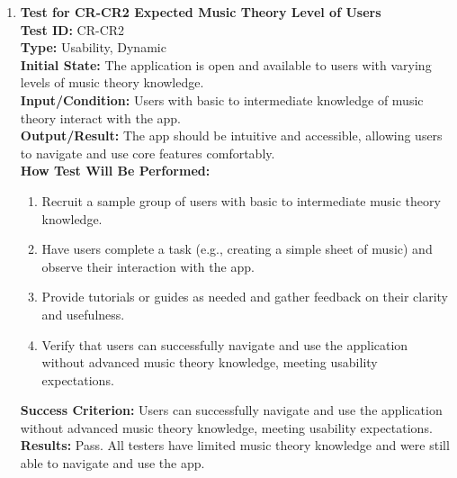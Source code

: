 \documentclass[12pt, titlepage]{article}
\begin{document}
\begin{enumerate}
    \item \textbf{Test for CR-CR2 Expected Music Theory Level of Users} \\
      \newline
      \textbf{Test ID:} CR-CR2 \\
      \textbf{Type:} Usability, Dynamic \\
      \textbf{Initial State:} The application is open and available to users with varying levels of music theory knowledge. \\
      \textbf{Input/Condition:} Users with basic to intermediate knowledge of music theory interact with the app. \\
      \textbf{Output/Result:} The app should be intuitive and accessible, allowing users to navigate and use core features comfortably. \\
      \textbf{How Test Will Be Performed:}
      \begin{enumerate}
          \item Recruit a sample group of users with basic to intermediate music theory knowledge.
          \item Have users complete a task (e.g., creating a simple sheet of music) and observe their interaction with the app.
          \item Provide tutorials or guides as needed and gather feedback on their clarity and usefulness.
          \item Verify that users can successfully navigate and use the application without advanced music theory knowledge, 
          meeting usability expectations.
      \end{enumerate}
      \textbf{Success Criterion:} Users can successfully navigate and use the application without advanced music theory knowledge, 
      meeting usability expectations.\\
      \textbf{Results:} Pass. All testers have limited music theory knowledge and were still able to navigate and use the app.\\


\end{enumerate}
\end{document}

